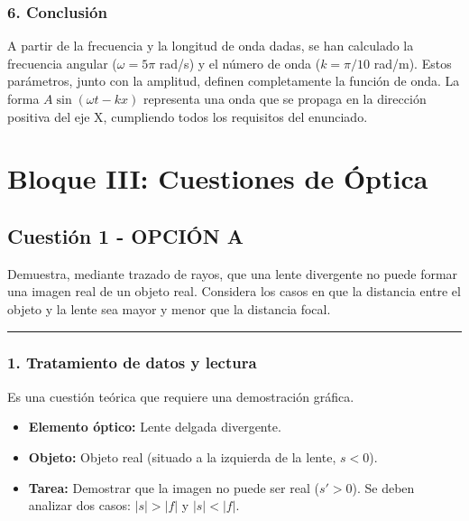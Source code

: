 \subsubsection*{6. Conclusión}
\begin{cajaconclusion}
A partir de la frecuencia y la longitud de onda dadas, se han calculado la frecuencia angular ($\omega=5\pi$ rad/s) y el número de onda ($k=\pi/10$ rad/m). Estos parámetros, junto con la amplitud, definen completamente la función de onda. La forma $A\sin(\omega t - kx)$ representa una onda que se propaga en la dirección positiva del eje X, cumpliendo todos los requisitos del enunciado.
\end{cajaconclusion}

\newpage

\section{Bloque III: Cuestiones de Óptica}
\label{sec:optica_2006_jun_ord}

\subsection{Cuestión 1 - OPCIÓN A}
\label{subsec:3A_2006_jun_ord}

\begin{cajaenunciado}
Demuestra, mediante trazado de rayos, que una lente divergente no puede formar una imagen real de un objeto real. Considera los casos en que la distancia entre el objeto y la lente sea mayor y menor que la distancia focal.
\end{cajaenunciado}
\hrule

\subsubsection*{1. Tratamiento de datos y lectura}
Es una cuestión teórica que requiere una demostración gráfica.
\begin{itemize}
    \item \textbf{Elemento óptico:} Lente delgada divergente.
    \item \textbf{Objeto:} Objeto real (situado a la izquierda de la lente, $s<0$).
    \item \textbf{Tarea:} Demostrar que la imagen no puede ser real ($s'>0$). Se deben analizar dos casos: $|s| > |f|$ y $|s| < |f|$.
\end{itemize}


